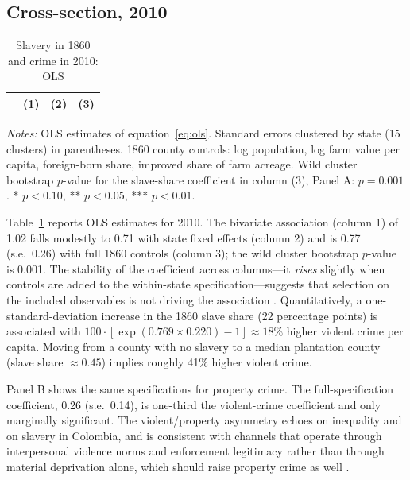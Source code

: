 \documentclass[12pt]{article}
\begin{document}
\subsection{Cross-section, 2010}

\begin{table}[H]
\centering
\caption{Slavery in 1860 and crime in 2010: OLS}
\label{tab:ols}
\begin{tabular}{lccc}
\toprule
 & (1) & (2) & (3) \\
\midrule

\bottomrule
\end{tabular}
\par\smallskip
\footnotesize\textit{Notes:} OLS estimates of equation~\eqref{eq:ols}. Standard errors clustered by state (15 clusters) in parentheses. 1860 county controls: log population, log farm value per capita, foreign-born share, improved share of farm acreage. Wild cluster bootstrap $p$-value for the slave-share coefficient in column (3), Panel A: $p = 0.001$. * $p<0.10$, ** $p<0.05$, *** $p<0.01$.
\end{table}

Table~\ref{tab:ols} reports OLS estimates for 2010. The bivariate association (column 1) of 1.02 falls modestly to 0.71 with state fixed effects (column 2) and is 0.77 (s.e.\ 0.26) with full 1860 controls (column 3); the wild cluster bootstrap $p$-value is 0.001. The stability of the coefficient across columns---it \emph{rises} slightly when controls are added to the within-state specification---suggests that selection on the included observables is not driving the association \citep[in the spirit of][]{altonji2005}. Quantitatively, a one-standard-deviation increase in the 1860 slave share (22 percentage points) is associated with $100\cdot[\exp(0.769 \times 0.220)-1] \approx 18\%$ higher violent crime per capita. Moving from a county with no slavery to a median plantation county (slave share $\approx 0.45$) implies roughly 41\% higher violent crime.

Panel B shows the same specifications for property crime. The full-specification coefficient, 0.26 (s.e.\ 0.14), is one-third the violent-crime coefficient and only marginally significant. The violent/property asymmetry echoes \citet{kelly2000} on inequality and \citet{buonanno2019} on slavery in Colombia, and is consistent with channels that operate through interpersonal violence norms and enforcement legitimacy rather than through material deprivation alone, which should raise property crime as well \citep{becker1968}.
\end{document}
